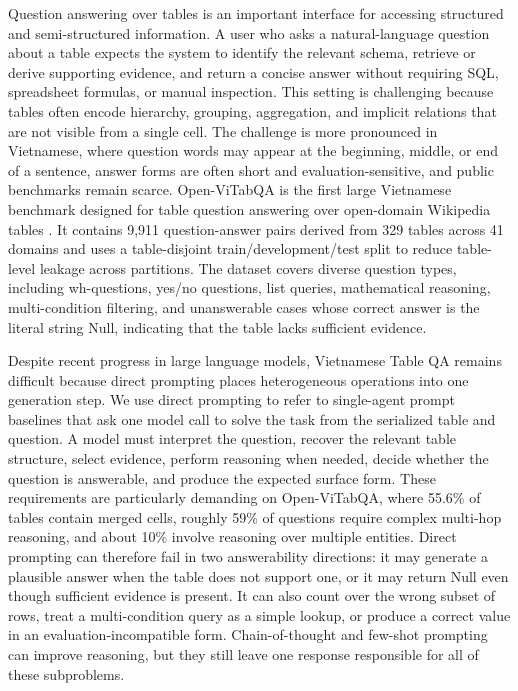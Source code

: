 \documentclass[]{interact}
\begin{document}
Question answering over tables is an important interface for accessing structured and semi-structured information. A user who asks a natural-language question about a table expects the system to identify the relevant schema, retrieve or derive supporting evidence, and return a concise answer without requiring SQL, spreadsheet formulas, or manual inspection. This setting is challenging because tables often encode hierarchy, grouping, aggregation, and implicit relations that are not visible from a single cell. The challenge is more pronounced in Vietnamese, where question words may appear at the beginning, middle, or end of a sentence, answer forms are often short and evaluation-sensitive, and public benchmarks remain scarce. Open-ViTabQA is the first large Vietnamese benchmark designed for table question answering over open-domain Wikipedia tables \citep{openvitabqa2025}. It contains 9,911 question-answer pairs derived from 329 tables across 41 domains and uses a table-disjoint train/development/test split to reduce table-level leakage across partitions. The dataset covers diverse question types, including wh-questions, yes/no questions, list queries, mathematical reasoning, multi-condition filtering, and unanswerable cases whose correct answer is the literal string Null, indicating that the table lacks sufficient evidence.

Despite recent progress in large language models, Vietnamese Table QA remains difficult because direct prompting places heterogeneous operations into one generation step. We use direct prompting to refer to single-agent prompt baselines that ask one model call to solve the task from the serialized table and question. A model must interpret the question, recover the relevant table structure, select evidence, perform reasoning when needed, decide whether the question is answerable, and produce the expected surface form. These requirements are particularly demanding on Open-ViTabQA, where 55.6\% of tables contain merged cells, roughly 59\% of questions require complex multi-hop reasoning, and about 10\% involve reasoning over multiple entities. Direct prompting can therefore fail in two answerability directions: it may generate a plausible answer when the table does not support one, or it may return Null even though sufficient evidence is present. It can also count over the wrong subset of rows, treat a multi-condition query as a simple lookup, or produce a correct value in an evaluation-incompatible form. Chain-of-thought and few-shot prompting can improve reasoning, but they still leave one response responsible for all of these subproblems.
\end{document}

